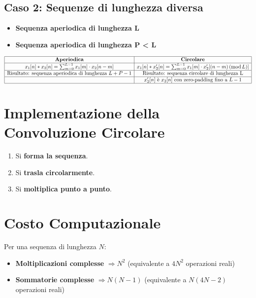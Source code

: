 \subsection*{Caso 2: Sequenze di lunghezza diversa}
\begin{itemize}
    \item \textbf{Sequenza aperiodica di lunghezza L}
    \item \textbf{Sequenza aperiodica di lunghezza P < L}
\end{itemize}
\[
\begin{array}{|c|c|}
\hline
\textbf{Aperiodica} & \textbf{Circolare} \\
\hline
x_1[n] * x_2[n] = \sum_{m=0}^{L-1} x_1[m] \cdot x_2[n-m] & x_1[n] * x_2'[n] = \sum_{m=0}^{L-1} x_1[m] \cdot x_2'[(n - m) \, (\text{mod} \, L)] \\
\hline
\text{Risultato: sequenza aperiodica di lunghezza } L + P - 1 & \text{Risultato: sequenza circolare di lunghezza L} \\
\hline
& x_2'[n] \text{ è } x_2[n] \text{ con zero-padding fino a } L-1 \\
\hline
\end{array}
\]

\section{Implementazione della Convoluzione Circolare}
\begin{enumerate}
    \item Si \textbf{forma la sequenza}.
    \item Si \textbf{trasla circolarmente}.
    \item Si \textbf{moltiplica punto a punto}.
\end{enumerate}

\section{Costo Computazionale}

Per una sequenza di lunghezza \( N \):

\begin{itemize}
    \item \textbf{Moltiplicazioni complesse} \( \Rightarrow N^2 \) (equivalente a \( 4N^2 \) operazioni reali)
    \item \textbf{Sommatorie complesse} \( \Rightarrow N(N-1) \) (equivalente a \( N(4N - 2) \) operazioni reali)
\end{itemize}

